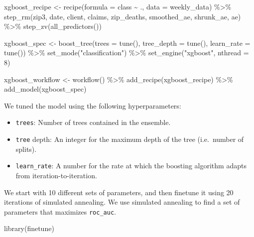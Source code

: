 \documentclass[
]{article}
\newenvironment{Shaded}{\begin{snugshade}}{\end{snugshade}}
\newcommand{\AttributeTok}[1]{\textcolor[rgb]{0.77,0.63,0.00}{#1}}
\newcommand{\DecValTok}[1]{\textcolor[rgb]{0.00,0.00,0.81}{#1}}
\newcommand{\FunctionTok}[1]{\textcolor[rgb]{0.00,0.00,0.00}{#1}}
\newcommand{\NormalTok}[1]{#1}
\newcommand{\OtherTok}[1]{\textcolor[rgb]{0.56,0.35,0.01}{#1}}
\newcommand{\SpecialCharTok}[1]{\textcolor[rgb]{0.00,0.00,0.00}{#1}}
\newcommand{\StringTok}[1]{\textcolor[rgb]{0.31,0.60,0.02}{#1}}
\providecommand{\tightlist}{%
  \setlength{\itemsep}{0pt}\setlength{\parskip}{0pt}}
\begin{document}
\begin{Shaded}
\begin{Highlighting}[]
\NormalTok{xgboost\_recipe }\OtherTok{\textless{}{-}}
  \FunctionTok{recipe}\NormalTok{(}\AttributeTok{formula =}\NormalTok{ class }\SpecialCharTok{\textasciitilde{}}\NormalTok{ ., }\AttributeTok{data =}\NormalTok{ weekly\_data) }\SpecialCharTok{\%\textgreater{}\%}
  \FunctionTok{step\_rm}\NormalTok{(zip3, date, client, claims, zip\_deaths, smoothed\_ae, shrunk\_ae, ae) }\SpecialCharTok{\%\textgreater{}\%}
  \FunctionTok{step\_zv}\NormalTok{(}\FunctionTok{all\_predictors}\NormalTok{())}

\NormalTok{xgboost\_spec }\OtherTok{\textless{}{-}}
  \FunctionTok{boost\_tree}\NormalTok{(}\AttributeTok{trees =} \FunctionTok{tune}\NormalTok{(), }\AttributeTok{tree\_depth =} \FunctionTok{tune}\NormalTok{(), }\AttributeTok{learn\_rate =} \FunctionTok{tune}\NormalTok{()) }\SpecialCharTok{\%\textgreater{}\%}
  \FunctionTok{set\_mode}\NormalTok{(}\StringTok{"classification"}\NormalTok{) }\SpecialCharTok{\%\textgreater{}\%}
  \FunctionTok{set\_engine}\NormalTok{(}\StringTok{"xgboost"}\NormalTok{, }\AttributeTok{nthread =} \DecValTok{8}\NormalTok{)}

\NormalTok{xgboost\_workflow }\OtherTok{\textless{}{-}}
  \FunctionTok{workflow}\NormalTok{() }\SpecialCharTok{\%\textgreater{}\%}
  \FunctionTok{add\_recipe}\NormalTok{(xgboost\_recipe) }\SpecialCharTok{\%\textgreater{}\%}
  \FunctionTok{add\_model}\NormalTok{(xgboost\_spec)}
\end{Highlighting}
\end{Shaded}

We tuned the model using the following hyperparameters:

\begin{itemize}
\tightlist
\item
  \texttt{trees}: Number of trees contained in the ensemble.
\item
  \texttt{tree} depth: An integer for the maximum depth of the tree
  (i.e.~number of splits).
\item
  \texttt{learn\_rate}: A number for the rate at which the boosting
  algorithm adapts from iteration-to-iteration.
\end{itemize}

We start with 10 different sets of parameters, and then finetune it
using 20 iterations of simulated annealing. We use simulated annealing
to find a set of parameters that maximizes \texttt{roc\_auc}.

\begin{Shaded}
\begin{Highlighting}[]
\FunctionTok{library}\NormalTok{(finetune)}
\end{Highlighting}
\end{Shaded}
\end{document}

